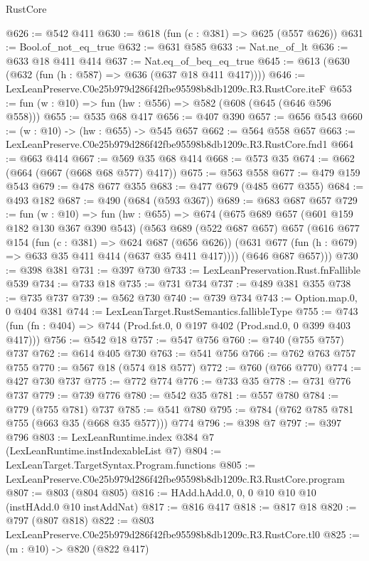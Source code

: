 \begin{lexlean}{RustCore}
\begin{coremodule}
@626 := @542 @411
@630 := @618 (fun (c : @381) => @625 (@557 @626))
@631 := Bool.of_not_eq_true
@632 := @631 @585
@633 := Nat.ne_of_lt
@636 := @633 @18 @411 @414
@637 := Nat.eq_of_beq_eq_true
@645 := @613 (@630 (@632 (fun (h : @587) => @636 (@637 @18 @411 @417))))
@646 := LexLeanPreserve.C0e25b979d286f42fbe95598b8db1209c.R3.RustCore.iteF
@653 := fun (w : @10) => fun (hw : @556) => @582 (@608 (@645 (@646 @596 @558)))
@655 := @535 @68 @417
@656 := @407 @390
@657 := @656 @543
@660 := (w : @10) -> (hw : @655) -> @545 @657
@662 := @564 @558 @657
@663 := LexLeanPreserve.C0e25b979d286f42fbe95598b8db1209c.R3.RustCore.fnd1
@664 := @663 @414
@667 := @569 @35 @68 @414
@668 := @573 @35
@674 := @662 (@664 (@667 (@668 @68 @577) @417))
@675 := @563 @558
@677 := @479 @159 @543
@679 := @478 @677 @355
@683 := @477 @679 (@485 @677 @355)
@684 := @493 @182
@687 := @490 (@684 (@593 @367))
@689 := @683 @687 @657
@729 := fun (w : @10) =>
  fun (hw : @655) =>
  @674
    (@675
      @689
      @657
      (@601 @159 @182 @130 @367 @390 @543)
      (@563
        @689
        (@522 @687 @657)
        @657
        (@616
          @677
          @154
          (fun (c : @381) => @624 @687 (@656 @626))
          (@631 @677 (fun (h : @679) => @633 @35 @411 @414 (@637 @35 @411 @417))))
        (@646 @687 @657)))
@730 := @398 @381
@731 := @397 @730
@733 := LexLeanPreservation.Rust.fnFallible @539
@734 := @733 @18
@735 := @731 @734
@737 := @489 @381 @355
@738 := @735 @737
@739 := @562 @730
@740 := @739 @734
@743 := Option.map.{0, 0} @404 @381
@744 := LexLeanTarget.RustSemantics.fallibleType
@755 := @743 (fun (fn : @404) => @744 (Prod.fst.{0, 0} @197 @402 (Prod.snd.{0, 0} @399 @403 @417)))
@756 := @542 @18
@757 := @547 @756
@760 := @740 (@755 @757) @737
@762 := @614 @405 @730
@763 := @541 @756
@766 := @762 @763 @757 @755
@770 := @567 @18 (@574 @18 @577)
@772 := @760 (@766 @770)
@774 := @427 @730 @737
@775 := @772 @774
@776 := @733 @35
@778 := @731 @776 @737
@779 := @739 @776
@780 := @542 @35
@781 := @557 @780
@784 := @779 (@755 @781) @737
@785 := @541 @780
@795 := @784 (@762 @785 @781 @755 (@663 @35 (@668 @35 @577))) @774
@796 := @398 @7
@797 := @397 @796
@803 := LexLeanRuntime.index @384 @7 (LexLeanRuntime.instIndexableList @7)
@804 := LexLeanTarget.TargetSyntax.Program.functions
@805 := LexLeanPreserve.C0e25b979d286f42fbe95598b8db1209c.R3.RustCore.program
@807 := @803 (@804 @805)
@816 := HAdd.hAdd.{0, 0, 0} @10 @10 @10 (instHAdd.{0} @10 instAddNat)
@817 := @816 @417
@818 := @817 @18
@820 := @797 (@807 @818)
@822 := @803 LexLeanPreserve.C0e25b979d286f42fbe95598b8db1209c.R3.RustCore.tl0
@825 := (m : @10) -> @820 (@822 @417)

\end{coremodule}
\end{lexlean}

